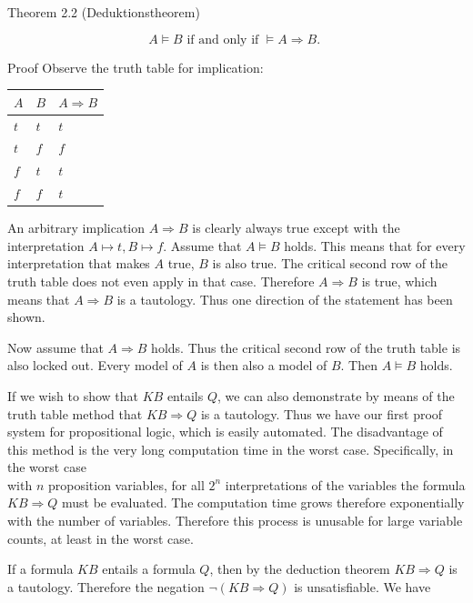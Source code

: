 \documentclass[10pt]{article}
\begin{document}
Theorem 2.2 (Deduktionstheorem)

$$
A \models B \text { if and only if } \models A \Rightarrow B \text {. }
$$

Proof Observe the truth table for implication:

\begin{center}
\begin{tabular}{lll}
\hline
$A$ & $B$ & $A \Rightarrow B$ \\
\hline
$t$ & $t$ & $t$ \\
\hline
$t$ & $f$ & $f$ \\
\hline
$f$ & $t$ & $t$ \\
\hline
$f$ & $f$ & $t$ \\
\hline
\end{tabular}
\end{center}

An arbitrary implication $A \Rightarrow B$ is clearly always true except with the interpretation $A \longmapsto t, B \longmapsto f$. Assume that $A \models B$ holds. This means that for every interpretation that makes $A$ true, $B$ is also true. The critical second row of the truth table does not even apply in that case. Therefore $A \Rightarrow B$ is true, which means that $A \Rightarrow B$ is a tautology. Thus one direction of the statement has been shown.

Now assume that $A \Rightarrow B$ holds. Thus the critical second row of the truth table is also locked out. Every model of $A$ is then also a model of $B$. Then $A \models B$ holds.

If we wish to show that $K B$ entails $Q$, we can also demonstrate by means of the truth table method that $K B \Rightarrow Q$ is a tautology. Thus we have our first proof system for propositional logic, which is easily automated. The disadvantage of this method is the very long computation time in the worst case. Specifically, in the worst case\\
with $n$ proposition variables, for all $2^{n}$ interpretations of the variables the formula $K B \Rightarrow Q$ must be evaluated. The computation time grows therefore exponentially with the number of variables. Therefore this process is unusable for large variable counts, at least in the worst case.


If a formula $K B$ entails a formula $Q$, then by the deduction theorem $K B \Rightarrow Q$ is a tautology. Therefore the negation $\neg(K B \Rightarrow Q)$ is unsatisfiable. We have
\end{document}
